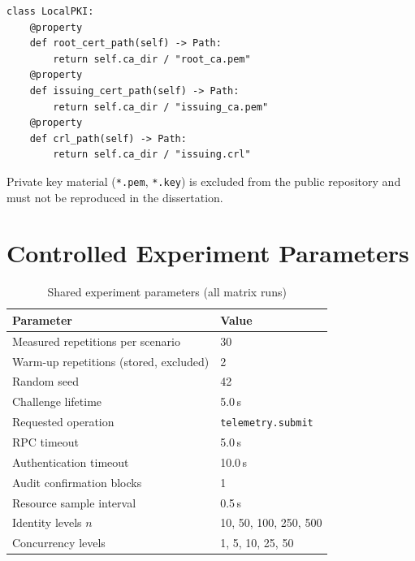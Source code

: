 \begin{lstlisting}[style=python,caption={PKI directory layout (\texttt{app/auth/x509/pki.py}, excerpt)},label=lst:pki-layout]
class LocalPKI:
    @property
    def root_cert_path(self) -> Path:
        return self.ca_dir / "root_ca.pem"
    @property
    def issuing_cert_path(self) -> Path:
        return self.ca_dir / "issuing_ca.pem"
    @property
    def crl_path(self) -> Path:
        return self.ca_dir / "issuing.crl"
\end{lstlisting}

Private key material (\texttt{*.pem}, \texttt{*.key}) is excluded from the public repository and must not be reproduced in the dissertation.

\section{Controlled Experiment Parameters}
\label{app:exp-params}

\begin{table}[htbp]
    \centering
    \caption{Shared experiment parameters (all matrix runs)}
    \label{tab:app-exp-params}
    \begin{tabular}{|l|l|}
        \hline
        \textbf{Parameter} & \textbf{Value} \\
        \hline
        Measured repetitions per scenario & 30 \\
        \hline
        Warm-up repetitions (stored, excluded) & 2 \\
        \hline
        Random seed & 42 \\
        \hline
        Challenge lifetime & 5.0\,s \\
        \hline
        Requested operation & \texttt{telemetry.submit} \\
        \hline
        RPC timeout & 5.0\,s \\
        \hline
        Authentication timeout & 10.0\,s \\
        \hline
        Audit confirmation blocks & 1 \\
        \hline
        Resource sample interval & 0.5\,s \\
        \hline
        Identity levels $n$ & 10, 50, 100, 250, 500 \\
        \hline
        Concurrency levels & 1, 5, 10, 25, 50 \\
        \hline
    \end{tabular}
\end{table}

